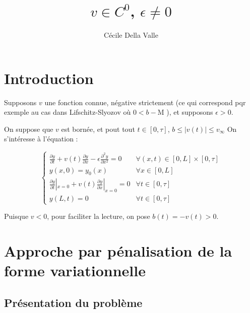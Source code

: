\documentclass[a4paper]{article}
\title{$v \in C^0$, $\epsilon \ne 0$}
\author{Cécile Della Valle}
\newcommand{\dep}{b}
\newcommand{\mass}{\mathrm{M}}
\begin{document}
\maketitle

\section{Introduction}

Supposons $v$ une fonction connue, négative strictement 
(ce qui correspond pqr exemple au cas dans Lifschitz-Slyozov où $0<\dep -\mass $ ), 
et supposons $\epsilon>0$. 

On suppose que $v$ est bornée, et pout tout $t \in[0,\tau]$, 
$ \dep \leq |v(t)| \leq v_{\infty} $
On s'intéresse à l'équation :


\begin{equation}
\label{eq:cas3}
\begin{cases}
 \displaystyle \frac{\partial y}{\partial t}
 + v(t) \frac{\partial y} {\partial x}  
 - \epsilon \frac{\partial^2 y} {\partial x^2}
 = 0  & \forall (x,t) \in [0,L] \times [0, \tau]\\
 y(x,0) = y_{0} (x) & \forall x \in [0,L] \\
 \displaystyle \frac{\partial y}{\partial t}|_{x=0}
 + v(t) \frac{\partial y} {\partial x}|_{x=0} = 0 & \forall t \in [0,\tau]\\
 y(L,t)=0 & \forall t \in [0,\tau]
\end{cases}
\end{equation}

Puisque $v<0$, pour faciliter la lecture, on pose $\dep (t) = - v(t) >0$.



\section{Approche par pénalisation de la forme variationnelle}


\subsection{Présentation du problème}
\end{document}
